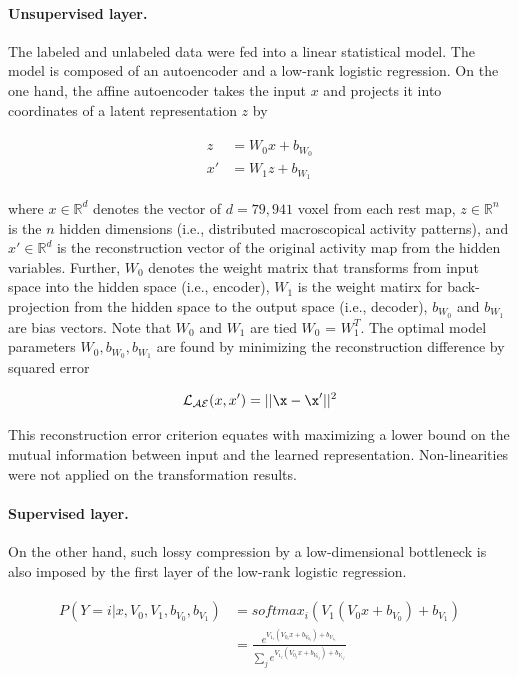 \documentclass{article} %
\begin{document}
\paragraph{Unsupervised layer.}
The labeled and unlabeled data were fed into a linear statistical model.
The model is composed of an autoencoder and a low-rank logistic regression.
On the one hand, the affine autoencoder takes the input 
$x$ and projects it into coordinates of a latent representation $z$
by

\begin{eqnarray}
  \begin{split}
  z &= W_0 x + b_{W_0} \\
  x' &= W_1 z + b_{W_1}
  \end{split}
  \label{eq:autoenc}
\end{eqnarray}

where $x \in \mathbb{R}^{d}$ denotes the vector of $d=79,941$ voxel from each
rest map, $z \in \mathbb{R}^{n}$ is the $n$ hidden dimensions (i.e.,
distributed macroscopical activity patterns), and 
$x' \in \mathbb{R}^{d}$ is the reconstruction vector of the original activity map
from the hidden variables. Further, ${W_0}$ denotes the weight matrix that
transforms
from input space into the hidden space (i.e., encoder),
${W_1}$ is the weight matirx for back-projection from the hidden space to the
output space (i.e., decoder), ${b_{W_0}}$ and ${b_{W_1}}$ are bias vectors.
Note that ${W_0}$ and ${W_1}$ are tied
$W_0$ = $W_1^T$.
The optimal model parameters ${W_0}, {b_{W_0}}, {b_{W_1}}$ are found by
minimizing the reconstruction difference by squared error

\begin{eqnarray}
  {\mathcal{L_{AE}}}(x, x') = || \x - \x' ||^2
\end{eqnarray}

This reconstruction error criterion equates with
maximizing a lower bound on the mutual information between
input and the learned representation.
Non-linearities were not applied on the
transformation results.

\paragraph{Supervised layer.}
On the other hand, such lossy compression by a low-dimensional bottleneck
is also imposed by the first layer of the low-rank
logistic regression.

\begin{eqnarray}
  \begin{split}
    P(Y=i|x, V_0,V_1,b_{V_0}, b_{V_1}) &= softmax_i(V_1 (V_0 x + b_{V_0}) + b_{V_1}) \\
    &= \frac {e^{V_1_i (V_0_i x + b_{V_0}_i) + b_{V_1}_i}} {\sum_j e^{V_1_j (V_0_j x + b_{V_0}_j) + b_{V_1}_j}}            
  \end{split}
  \label{eq:lr}
\end{eqnarray}
\end{document}
